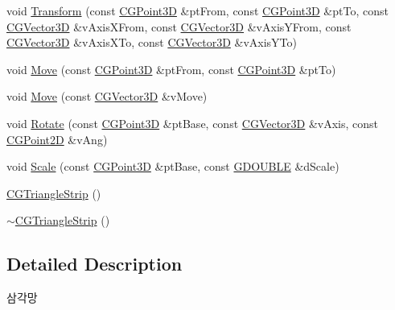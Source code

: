 \begin{DoxyCompactItemize}
\item 
void \hyperlink{class_c_g_triangle_strip_afec164718e677a3385179ca563091b81}{Transform} (const \hyperlink{class_c_g_point3_d}{C\+G\+Point3\+D} \&pt\+From, const \hyperlink{class_c_g_point3_d}{C\+G\+Point3\+D} \&pt\+To, const \hyperlink{_g_point3_d_8h_aa7e73d39f4c991acb5a13c84b498366d}{C\+G\+Vector3\+D} \&v\+Axis\+X\+From, const \hyperlink{_g_point3_d_8h_aa7e73d39f4c991acb5a13c84b498366d}{C\+G\+Vector3\+D} \&v\+Axis\+Y\+From, const \hyperlink{_g_point3_d_8h_aa7e73d39f4c991acb5a13c84b498366d}{C\+G\+Vector3\+D} \&v\+Axis\+X\+To, const \hyperlink{_g_point3_d_8h_aa7e73d39f4c991acb5a13c84b498366d}{C\+G\+Vector3\+D} \&v\+Axis\+Y\+To)
\item 
void \hyperlink{class_c_g_triangle_strip_a492195c3719db121b50e92ea8be42315}{Move} (const \hyperlink{class_c_g_point3_d}{C\+G\+Point3\+D} \&pt\+From, const \hyperlink{class_c_g_point3_d}{C\+G\+Point3\+D} \&pt\+To)
\item 
void \hyperlink{class_c_g_triangle_strip_a4bfc7702c56d22f6f4fd7a89de68db8c}{Move} (const \hyperlink{_g_point3_d_8h_aa7e73d39f4c991acb5a13c84b498366d}{C\+G\+Vector3\+D} \&v\+Move)
\item 
void \hyperlink{class_c_g_triangle_strip_acf5f7738937e2b0a5a9fc51cc863e376}{Rotate} (const \hyperlink{class_c_g_point3_d}{C\+G\+Point3\+D} \&pt\+Base, const \hyperlink{_g_point3_d_8h_aa7e73d39f4c991acb5a13c84b498366d}{C\+G\+Vector3\+D} \&v\+Axis, const \hyperlink{class_c_g_point2_d}{C\+G\+Point2\+D} \&v\+Ang)
\item 
void \hyperlink{class_c_g_triangle_strip_a9d04359995c7c5bb53b28074b8aaf21e}{Scale} (const \hyperlink{class_c_g_point3_d}{C\+G\+Point3\+D} \&pt\+Base, const \hyperlink{_g_types_8h_afd05ac85f90ee8e2a733928545462cd4}{G\+D\+O\+U\+B\+L\+E} \&d\+Scale)
\item 
\hyperlink{class_c_g_triangle_strip_ab030dcf1b9db152c726edb16188432e4}{C\+G\+Triangle\+Strip} ()
\item 
\hyperlink{class_c_g_triangle_strip_a80611751b4866e6f14d1f1dd15743780}{$\sim$\+C\+G\+Triangle\+Strip} ()
\end{DoxyCompactItemize}


\subsection{Detailed Description}

\begin{DoxyItemize}
\item 삼각망 
\end{DoxyItemize}

